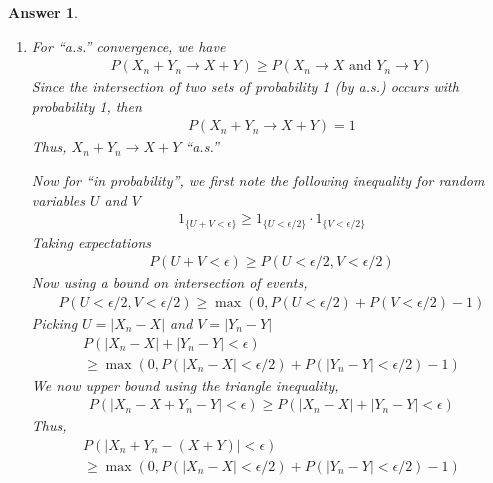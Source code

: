 \documentclass[12pt]{article}
\theoremstyle{colon}
\newtheorem*{answer}{Answer}
\begin{document}
\begin{answer}
  \leavevmode
  \begin{enumerate}[label=\alph*)]
    \item For ``a.s.'' convergence, we have
      \begin{gather*}
        P(X_n + Y_n \rightarrow X + Y) \geq P(X_n \rightarrow X \text{ and } Y_n \rightarrow Y)
      \end{gather*}
      Since the intersection of two sets of probability 1 (by a.s.) occurs with probability 1, then
      \begin{gather*}
        P(X_n + Y_n \rightarrow X + Y) = 1
      \end{gather*}
      Thus, $X_n + Y_n \rightarrow X + Y$ ``a.s.''

      Now for ``in probability'', we first note the following inequality for random variables $U$ and $V$
      \begin{gather*}
        1_{ \{ U + V < \epsilon \} } \geq 1_{ \{ U < \epsilon/2 \} } \cdot 1_{ \{ V < \epsilon/2 \} }
      \end{gather*}
      Taking expectations
      \begin{gather*}
        P( U + V < \epsilon ) \geq P( U < \epsilon/2, V < \epsilon/2 )
      \end{gather*}
      Now using a bound on intersection of events,
      \begin{gather*}
        P( U < \epsilon/2, V < \epsilon/2 ) \geq \max(0, P(U < \epsilon/2) + P(V < \epsilon/2) - 1)
      \end{gather*}
      Picking $U = \lvert X_n - X \rvert$ and $V = \lvert Y_n - Y \rvert$
      \begin{gather*}
        P( \lvert X_n - X \rvert + \lvert Y_n - Y \rvert < \epsilon ) \\
        \geq \max(0, P(\lvert X_n - X \rvert < \epsilon/2) + P(\lvert Y_n - Y \rvert < \epsilon/2) - 1)
      \end{gather*}
      We now upper bound using the triangle inequality,
      \begin{gather*}
        P( \lvert X_n - X + Y_n - Y \rvert < \epsilon ) \geq P( \lvert X_n - X \rvert + \lvert Y_n - Y \rvert < \epsilon )
      \end{gather*}
      Thus,
      \begin{gather*}
        P( \lvert X_n + Y_n - (X + Y) \rvert < \epsilon ) \\
        \geq \max(0, P(\lvert X_n - X \rvert < \epsilon/2) + P(\lvert Y_n - Y \rvert < \epsilon/2) - 1)
      \end{gather*}


\end{enumerate}
\end{answer}
\end{document}
